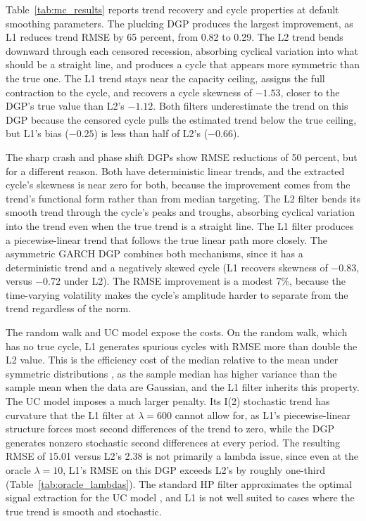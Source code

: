 \documentclass[10pt]{article}
\begin{document}
Table~\ref{tab:mc_results} reports trend recovery and cycle properties at default smoothing parameters. The plucking DGP produces the largest improvement, as L1 reduces trend RMSE by 65 percent, from 0.82 to 0.29. The L2 trend bends downward through each censored recession, absorbing cyclical variation into what should be a straight line, and produces a cycle that appears more symmetric than the true one. The L1 trend stays near the capacity ceiling, assigns the full contraction to the cycle, and recovers a cycle skewness of $-1.53$, closer to the DGP's true value than L2's $-1.12$. Both filters underestimate the trend on this DGP because the censored cycle pulls the estimated trend below the true ceiling, but L1's bias ($-0.25$) is less than half of L2's ($-0.66$).

The sharp crash and phase shift DGPs show RMSE reductions of 50 percent, but for a different reason. Both have deterministic linear trends, and the extracted cycle's skewness is near zero for both, because the improvement comes from the trend's functional form rather than from median targeting. The L2 filter bends its smooth trend through the cycle's peaks and troughs, absorbing cyclical variation into the trend even when the true trend is a straight line. The L1 filter produces a piecewise-linear trend that follows the true linear path more closely. The asymmetric GARCH DGP combines both mechanisms, since it has a deterministic trend and a negatively skewed cycle (L1 recovers skewness of $-0.83$, versus $-0.72$ under L2). The RMSE improvement is a modest 7\%, because the time-varying volatility makes the cycle's amplitude harder to separate from the trend regardless of the norm.

The random walk and UC model expose the costs. On the random walk, which has no true cycle, L1 generates spurious cycles with RMSE more than double the L2 value. This is the efficiency cost of the median relative to the mean under symmetric distributions \citep{lehmann_casella1998}, as the sample median has higher variance than the sample mean when the data are Gaussian, and the L1 filter inherits this property. The UC model imposes a much larger penalty. Its I(2) stochastic trend has curvature that the L1 filter at $\lambda = 600$ cannot allow for, as L1's piecewise-linear structure forces most second differences of the trend to zero, while the DGP generates nonzero stochastic second differences at every period. The resulting RMSE of 15.01 versus L2's 2.38 is not primarily a lambda issue, since even at the oracle $\lambda = 10$, L1's RMSE on this DGP exceeds L2's by roughly one-third (Table~\ref{tab:oracle_lambdas}). The standard HP filter approximates the optimal signal extraction for the UC model \citep{harvey_jaeger1993}, and L1 is not well suited to cases where the true trend is smooth and stochastic.
\end{document}
